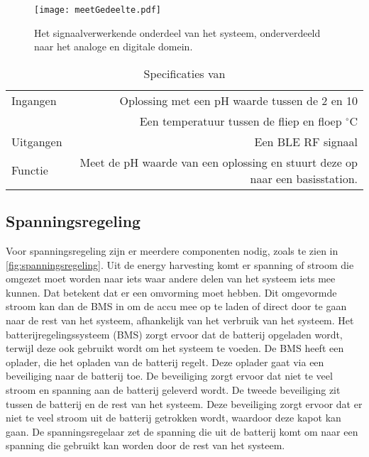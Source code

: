 \begin{figure}[ht]
    \centering
    \texttt{[image: meetGedeelte.pdf]}
    \caption{Het signaalverwerkende onderdeel van het systeem, onderverdeeld naar het analoge en digitale domein.}
    \label{fig:signaalverwerking}
\end{figure}


\begin{table}[ht]
    \centering
    \begin{tabular}{|l|r|}
        \hline     
        Ingangen    & Oplossing met een pH waarde tussen de 2 en 10 \\
                    & Een temperatuur tussen de fliep en floep $^\circ$C \\
        \hline
        Uitgangen   & Een BLE RF signaal \\
        \hline
        Functie     & Meet de pH waarde van een oplossing en stuurt deze op naar een basisstation.  \\
        \hline
    \end{tabular}
    \caption{Specificaties van }
    \label{tab:in en uitgangen}
\end{table}

\subsection{Spanningsregeling}
Voor spanningsregeling zijn er meerdere componenten nodig, zoals te zien in \autoref{fig:spanningsregeling}. Uit de energy harvesting komt er spanning of stroom die omgezet moet worden naar iets waar andere delen van het systeem iets mee kunnen. Dat betekent dat er een omvorming moet hebben. Dit omgevormde stroom kan dan de BMS in om de accu mee op te laden of direct door te gaan naar de rest van het systeem, afhankelijk van het verbruik van het systeem. 
Het batterijregelingssysteem (BMS) zorgt ervoor dat de batterij opgeladen wordt, terwijl deze ook gebruikt wordt om het systeem te voeden.
De BMS heeft een oplader, die het opladen van de batterij regelt. Deze oplader gaat via een beveiliging naar de batterij toe. De beveiliging zorgt ervoor dat niet te veel stroom en spanning aan de batterij geleverd wordt. De tweede beveiliging zit tussen de batterij en de rest van het systeem. Deze beveiliging zorgt ervoor dat er niet te veel stroom uit de batterij getrokken wordt, waardoor deze kapot kan gaan. De spanningsregelaar zet de spanning die uit de batterij komt om naar een spanning die gebruikt kan worden door de rest van het systeem. 

